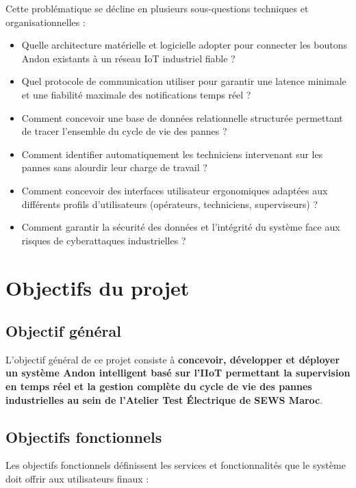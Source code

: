 Cette problématique se décline en plusieurs sous-questions techniques et organisationnelles :

\begin{itemize}
    \item Quelle architecture matérielle et logicielle adopter pour connecter les boutons Andon existants à un réseau IoT industriel fiable ?
    \item Quel protocole de communication utiliser pour garantir une latence minimale et une fiabilité maximale des notifications temps réel ?
    \item Comment concevoir une base de données relationnelle structurée permettant de tracer l'ensemble du cycle de vie des pannes ?
    \item Comment identifier automatiquement les techniciens intervenant sur les pannes sans alourdir leur charge de travail ?
    \item Comment concevoir des interfaces utilisateur ergonomiques adaptées aux différents profils d'utilisateurs (opérateurs, techniciens, superviseurs) ?
    \item Comment garantir la sécurité des données et l'intégrité du système face aux risques de cyberattaques industrielles ?
\end{itemize}

\section{Objectifs du projet}

\subsection{Objectif général}

L'objectif général de ce projet consiste à \textbf{concevoir, développer et déployer un système Andon intelligent basé sur l'IIoT permettant la supervision en temps réel et la gestion complète du cycle de vie des pannes industrielles au sein de l'Atelier Test Électrique de SEWS Maroc}.


\subsection{Objectifs fonctionnels}

Les objectifs fonctionnels définissent les services et fonctionnalités que le système doit offrir aux utilisateurs finaux :

